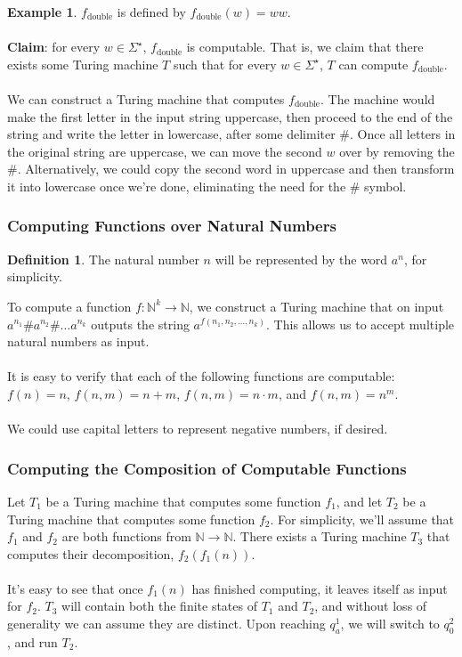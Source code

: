 \documentclass[]{article}
\theoremstyle{definition}
\newtheorem*{defn}{Definition}
\newtheorem{ex}{Example}[section]
\begin{document}
      \begin{ex}
        $f_\text{double}$ is defined by $f_\text{double}(w) = ww$.
        \\ \\
        \textbf{Claim}: for every $w \in \Sigma^\star$, $f_\text{double}$ is computable. That is, we claim that there exists some Turing machine $T$ such that for every $w \in \Sigma^\star$, $T$ can compute $f_\text{double}$.
        \\ \\
        We can construct a Turing machine that computes $f_\text{double}$. The machine would make the first letter in the input string uppercase, then proceed to the end of the string and write the letter in lowercase, after some delimiter \#. Once all letters in the original string are uppercase, we can move the second $w$ over by removing the \#. Alternatively, we could copy the second word in uppercase and then transform it into lowercase once we're done, eliminating the need for the \# symbol.
      \end{ex}

      \subsubsection{Computing Functions over Natural Numbers}
        \begin{defn}
          The natural number $n$ will be represented by the word $a^n$, for simplicity.
        \end{defn}

        To compute a function $f : \mathbb{N}^k \to \mathbb{N}$, we construct a Turing machine that on input $a^{n_1} \# a^{n_2} \# \ldots a^{n_k}$ outputs the string $a^{f(n_1, n_2, \ldots, n_k)}$. This allows us to accept multiple natural numbers as input.
        \\ \\
        It is easy to verify that each of the following functions are computable: $f(n) = n$, $f(n, m) = n + m$, $f(n, m) = n \cdot m$, and $f(n, m) = n^m$.
        \\ \\
        We could use capital letters to represent negative numbers, if desired.

      \subsubsection{Computing the Composition of Computable Functions}
        Let $T_1$ be a Turing machine that computes some function $f_1$, and let $T_2$ be a Turing machine that computes some function $f_2$. For simplicity, we'll assume that $f_1$ and $f_2$ are both functions from $\mathbb{N} \to \mathbb{N}$. There exists a Turing machine $T_3$ that computes their decomposition, $f_2(f_1(n))$.
        \\ \\
        It's easy to see that once $f_1(n)$ has finished computing, it leaves itself as input for $f_2$. $T_3$ will contain both the finite states of $T_1$ and $T_2$, and without loss of generality we can assume they are distinct. Upon reaching $q_a^1$, we will switch to $q_0^2$, and run $T_2$.
\end{document}
